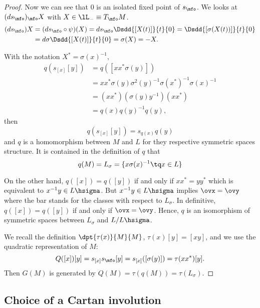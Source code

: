 \begin{proof}
Now we can see that $0$ is an isolated fixed point of $s_{\mfo}$. We looks at $(ds_{\mfo})_{\mfo}X$ with $X\in\lL_-\equiv T_{\mfo}M$.
\begin{equation}
\begin{split}
  (ds_{\mfo})X&=(ds_{\mfo}\circ\psi)(X)
		=ds_{\mfo}\Dsdd{[X(t)]}{t}{0}
                =\Dsdd{ [\sigma(X(t))] }{t}{0}\\
		&=d\sigma\Dsdd{[X(t)]}{t}{0}
		=\sigma(X)
		=-X.
\end{split}
\end{equation}

With the notation $X^*=\sigma(x)^{-1}$,
\begin{equation}
\begin{split}
  q\left( s_{[x]}[y]  \right)&=q( [xx^*\sigma(y)] )\\
                             &=xx^*\sigma(y)\sigma^2(y)^{-1}\sigma(x^*)^{-1}\sigma(x)^{-1}\\
			     &=(xx^*)(\sigma(y)y^{-1})(xx^*)\\
			     &=q(x)q(y)^{-1} q(y),
\end{split}
\end{equation}
then
\[
   q(s_{[x]}[y])=s_{q(x)}q(y)
\]
and $q$ is a homomorphism between $M$ and $L$ for they respective symmetric spaces structure. It is contained in the definition of $q$ that
\[
   q(M)=L_{\sigma}=\{x\sigma(x)^{-1}\tq x\in L\}
\]

On the other hand, $q([x])=q([y])$ if and only if $xx^*=yy^*$ which is equivalent to  $x^{-1} y\in L\hsigma$. But $x^{-1} y\in L\hsigma$ implies $\ovx=\ovy$ where the bar stands for the classes with respect to $L_{\sigma}$. In definitive, $q([x])=q([y])$ if and only if $\ovx=\ovy$. Hence, $q$ is an isomorphism of symmetric spaces between $L_{\sigma}$ and $L/L\hsigma$.

We recall the definition $\dpt{\tau(x)}{M}{M}$, $\tau(x)[y]=[xy]$, and we use the quadratic representation of $M$:
\begin{equation}
 Q([x])[y]=s_{[x]}s_{\mfo}[y]
          =s_{[x]}([\sigma(y)])
	  =\tau(xx^*)[y].
\end{equation}
Then $G(M)$ is generated by $Q(M)=\tau(q(M))=\tau(L_{\sigma})$.
\end{proof}

\subsection{Choice of a Cartan involution}

